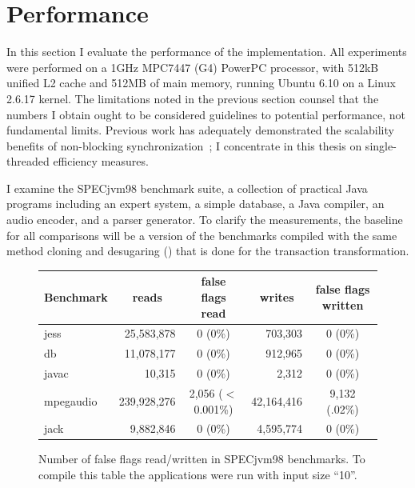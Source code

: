 \section{Performance}\label{sec:full-bench}
In this section I evaluate the performance of the \apex implementation.
All experiments were performed on a 1GHz MPC7447 (G4) PowerPC processor,
with 512kB unified L2 cache and 512MB of main memory, running Ubuntu
6.10 on a Linux 2.6.17 kernel.  The limitations noted in the previous
section counsel that the numbers I obtain ought to be considered
guidelines to potential performance, not fundamental limits.
Previous work has adequately demonstrated the scalability
benefits of non-blocking synchronization~\cite{LaMarca94,GreenwaldCh96,MassalinPu91,RajwarGo01,RajwarGo02,HammondWoCh04,AnanianAsKuLeLi05};
I concentrate in this thesis on single-threaded efficiency measures.

I examine the SPECjvm98 benchmark suite, a collection of
practical Java programs including an expert system, a simple database,
a Java compiler, an audio encoder, and a parser generator.  To clarify
the measurements, the baseline for all comparisons will be a
version of the benchmarks compiled with the same method cloning and
desugaring () that is done for the transaction
transformation.


\begin{figure}\small %
\begin{tabular}{|l||r|c||r|c|}
Benchmark &\multicolumn{1}{c|}{reads}& false flags read &\multicolumn{1}{c|}{writes}& false flags written
\\ \hline
jess &      25,583,878 & 0  (0\%)&  703,303  &  0  (0\%) \\
db &        11,078,177 & 0  (0\%)&  912,965  &  0  (0\%) \\
javac &         10,315 & 0  (0\%)&    2,312  &  0  (0\%) \\
mpegaudio& 239,928,276 & 2,056  ($<$0.001\%)&  42,164,416  &  9,132 (.02\%) \\
jack &       9,882,846 & 0  (0\%)& 4,595,774 &  0 (0\%) \\ \hline
\end{tabular}
\caption[Number of false flags read/written in SPECjvm98 benchmarks.]
{Number of false flags read/written in SPECjvm98 benchmarks.  To
  compile this table the
  applications were run with input size ``10''.}
\label{fig:false-flag}
\end{figure}

